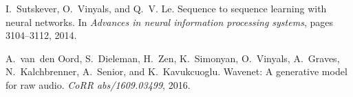\documentclass{article}
\begin{document}
\begin{thebibliography}{19}
I.~Sutskever, O.~Vinyals, and Q.~V. Le.
\newblock Sequence to sequence learning with neural networks.
\newblock In \emph{Advances in neural information processing systems}, pages
  3104--3112, 2014.

A.~van~den Oord, S.~Dieleman, H.~Zen, K.~Simonyan, O.~Vinyals, A.~Graves,
  N.~Kalchbrenner, A.~Senior, and K.~Kavukcuoglu.
\newblock Wavenet: A generative model for raw audio.
\newblock \emph{CoRR abs/1609.03499}, 2016.

\end{thebibliography}
\end{document}
